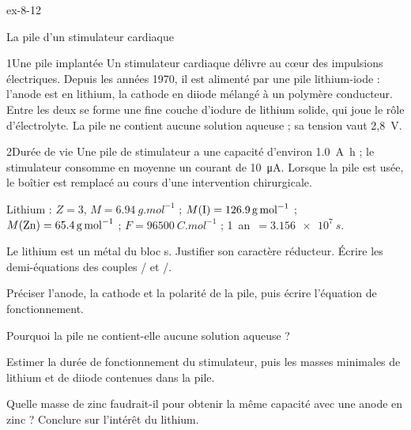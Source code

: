 \begin{blocLivre}{ex-8-12}
\begin{exercice}[3]{La pile d'un stimulateur cardiaque}
\begin{docu}{1}{Une pile implantée}
Un stimulateur cardiaque délivre au cœur des impulsions électriques. Depuis les années 1970, il est alimenté par une
pile lithium-iode : l'anode est en lithium, la cathode en diiode mélangé à un polymère conducteur. Entre les deux se
forme une fine couche d'iodure de lithium solide, qui joue le rôle d'électrolyte. La pile ne contient aucune solution
aqueuse ; sa tension vaut 2,8~V.
\end{docu}
\begin{docu}{2}{Durée de vie}
Une pile de stimulateur a une capacité d'environ \qty{1,0}{A.h} ; le stimulateur consomme en moyenne un courant de
\qty{10}{\micro A}. Lorsque la pile est usée, le boîtier est remplacé au cours d'une intervention chirurgicale.
\end{docu}
\begin{donnees}
Lithium : $Z=3$, $M=\qty{6,94}{g.mol^{-1}}$ ; $M(\ce{I})=\qty{126,9}{g.mol^{-1}}$ ; $M(\ce{Zn})=\qty{65,4}{g.mol^{-1}}$ ;
$F=\qty{96500}{C.mol^{-1}}$ ; \mbox{1 an $=\qty{3,156e7}{s}$}.
\end{donnees}
\begin{questions}
\item Le lithium est un métal du bloc s. Justifier son caractère réducteur. Écrire les demi-équations des couples
/ et /.
\item Préciser l'anode, la cathode et la polarité de la pile, puis écrire l'équation de fonctionnement.
\item Pourquoi la pile ne contient-elle aucune solution aqueuse ?
\item \initiative Estimer la durée de fonctionnement du stimulateur, puis les masses minimales de lithium et de diiode
contenues dans la pile.
\item Quelle masse de zinc faudrait-il pour obtenir la même capacité avec une anode en zinc ? Conclure sur l'intérêt du
lithium.
\end{questions}
\end{exercice}
\end{blocLivre}
